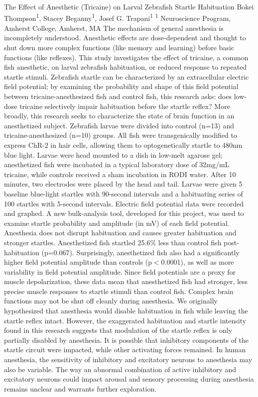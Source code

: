 \makeabstract
    {
    The Effect of Anesthetic (Tricaine) on Larval Zebrafish Startle Habituation
    }
    {
    Bokei Thompson\textsuperscript{1}, Stacey Beganny\textsuperscript{1}, Josef G. Trapani\textsuperscript{1}
    }
    {
    \textsuperscript{1} Neuroscience Program, Amherst College, Amherst, MA
    }
    {
    The mechanism of general anesthesia is incompletely understood. Anesthetic effects are dose-dependent and thought to shut down more complex functions (like memory and learning) before basic functions (like reflexes). This study investigates the effect of tricaine, a common fish anesthetic, on larval zebrafish habituation, or reduced response to repeated startle stimuli. Zebrafish startle can be characterized by an extracellular electric field potential; by examining the probability and shape of this field potential between tricaine-anesthesized fish and control fish, this research asks: does low-dose tricaine selectively impair habituation before the startle reflex? More broadly, this research seeks to characterize the state of brain function in an anesthetized subject.
    }
    {
    Zebrafish larvae were divided into control (n=13) and tricaine-anesthesized (n=10) groups. All fish were transgenically modified to express ChR-2 in hair cells, allowing them to optogenetically startle to 480nm blue light. Larvae were head mounted to a dish in low-melt agarose gel; anesthetized fish were incubated in a typical laboratory dose of 32mg/mL tricaine, while controls received a sham incubation in RODI water. After 10 minutes, two electrodes were placed by the head and tail. Larvae were given 5 baseline blue-light startles with 90-second intervals and a habituating series of 100 startles with 5-second intervals. Electric field potential data were recorded and graphed. A new bulk-analysis tool, developed for this project, was used to examine startle probability and amplitude (in mV) of each field potential.
    }
    {
    Anesthesia does not disrupt habituation and causes greater habituation and stronger startles. Anesthetized fish startled 25.6\% less than control fish post-habituation (p=0.067). Surprisingly, anesthetized fish also had a significantly higher field potential amplitude than controls (p\ensuremath{<}0.0001), as well as more variability in field potential amplitude. Since field potentials are a proxy for muscle depolarization, these data mean that anesthetized fish had stronger, less precise muscle responses to startle stimuli than control fish.
    }
    {
    Complex brain functions may not be shut off cleanly during anesthesia. We originally hypothesized that anesthesia would disable habituation in fish while leaving the startle reflex intact. However, the exaggerated habituation and startle intensity found in this research suggests that modulation of the startle reflex is only partially disabled by anesthesia. It is possible that inhibitory components of the startle circuit were impacted, while other activating forces remained. In human anesthesia, the sensitivity of inhibitory and excitatory neurons to anesthesia may also be variable. The way an abnormal combination of active inhibitory and excitatory neurons could impact arousal and sensory processing during anesthesia remains unclear and warrants further exploration.
    }

    \newpage
    